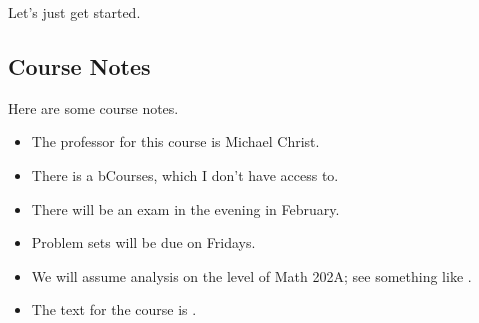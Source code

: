 \documentclass[../notes.tex]{subfiles}
\begin{document}
Let's just get started.

\subsection{Course Notes}
Here are some course notes.
\begin{itemize}
	\item The professor for this course is Michael Christ.
	\item There is a bCourses, which I don't have access to.
	\item There will be an exam in the evening in February.
	\item Problem sets will be due on Fridays.
	\item We will assume analysis on the level of Math 202A; see something like \cite{elber-top}.
	\item The text for the course is \cite{folland}.
\end{itemize}
\end{document}
